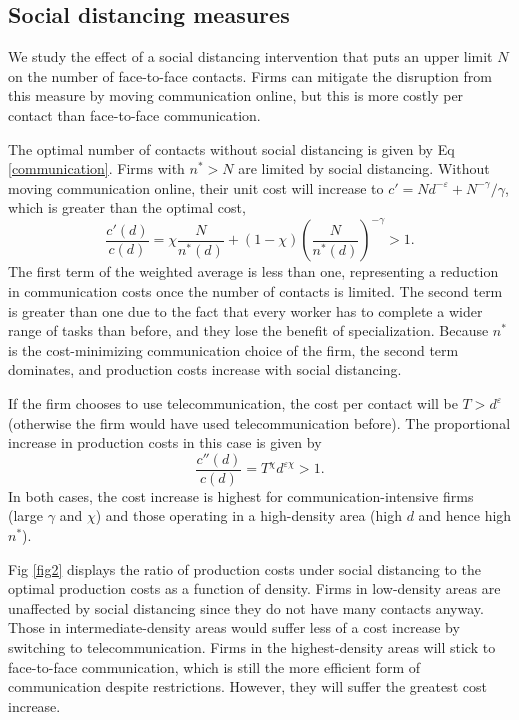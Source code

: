 \subsection*{Social distancing measures}
We study the effect of a social distancing intervention that puts an upper limit $N$ on the number of face-to-face contacts. Firms can mitigate the disruption from this measure by moving communication online, but this is more costly per contact than face-to-face communication.

The optimal number of contacts without social distancing is given by Eq \eqref{communication}. Firms with $n^*>N$ are limited by social distancing. Without moving communication online, their unit cost will increase to $c' = N d^{-\varepsilon} + N^{-\gamma}/\gamma$, which is greater than the optimal cost,
\begin{equation}\label{socdist}
\frac{c'(d)}{c(d)} 
	= \chi \frac{N}{n^*(d)} + (1-\chi) \left(\frac{N}{n^*(d)}\right)^{-\gamma}>1.
\end{equation}
The first term of the weighted average is less than one, representing a reduction in communication costs once the number of contacts is limited. The second term is greater than one due to the fact that every worker has to complete a wider range of tasks than before, and they lose the benefit of specialization. Because $n^*$ is the cost-minimizing communication choice of the firm, the second term dominates, and production costs increase with social distancing.

If the firm chooses to use telecommunication, the cost per contact will be $T>d^{\varepsilon}$ (otherwise the firm would have used telecommunication before). The proportional increase in production costs in this case is given by
\begin{equation}\label{telco}
\frac{c''(d)}{c(d)} 
	= T^\chi d^{\varepsilon \chi}
	>1.
\end{equation}
In both cases, the cost increase is highest for communication-intensive firms (large $\gamma$ and $\chi$) and those operating in a high-density area (high $d$ and hence high $n^*$).

Fig \ref{fig2} displays the ratio of production costs under social distancing to the optimal production costs as a function of density. Firms in low-density areas are unaffected by social distancing since they do not have many contacts anyway. Those in intermediate-density areas would suffer less of a cost increase by switching to telecommunication. Firms in the highest-density areas will stick to face-to-face communication, which is still the more efficient form of communication despite restrictions. However, they will suffer the greatest cost increase. 

